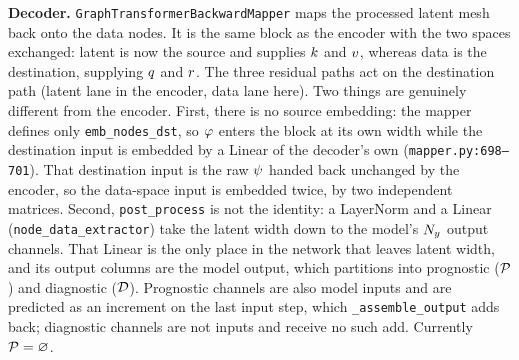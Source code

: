 \documentclass[11pt,landscape]{article}
\begin{document}
\clearpage

\vspace*{\fill}
\begin{center}
  \resizebox{\textwidth}{!}{}
\end{center}
\vspace*{\fill}

{\footnotesize
    \textbf{Decoder.}\;
    \texttt{GraphTransformerBackwardMapper} maps the processed latent mesh back
    onto the data nodes. It is the same block as the encoder with the two spaces
    exchanged: latent is now the source and supplies $k$ and $v$,
    whereas data is the destination, supplying $q$ and $r$.
    The three residual paths act on the destination path (latent lane in the encoder,
    data lane here).
    Two things are genuinely different from the encoder.
    First, there is no source embedding: the mapper defines only
    \texttt{emb\_nodes\_dst}, so $\varphi$ enters the block at its own width
    while the destination input is embedded by a Linear of the decoder's own
    (\texttt{mapper.py:698--701}). That destination input is the raw
    $\psi$ handed back unchanged by the encoder, so the data-space input is
    embedded twice, by two independent matrices.
    Second, \texttt{post\_process} is not the identity: a LayerNorm and a Linear
    (\texttt{node\_data\_extractor}) take the latent width down to the
    model's $N_{y}$ output channels. That Linear is the only place in the
    network that leaves latent width, and its output columns are the model
    output, which partitions into prognostic ($\mathcal{P}$) and diagnostic
    ($\mathcal{D}$). Prognostic channels
    are also model inputs and are predicted as an increment on the last input
    step, which \texttt{\_assemble\_output} adds back; diagnostic channels are
    not inputs and receive no such add. Currently $\mathcal{P} = \varnothing$.
\par}

\clearpage
\end{document}
